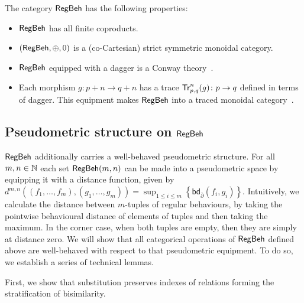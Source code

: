 \begin{theorem}
	The category $\mathsf{RegBeh}$ has the following properties:
	\begin{itemize}
		\item $\mathsf{RegBeh}$ has all finite coproducts. 
		\item $(\mathsf{RegBeh}, \oplus, 0)$ is a (co-Cartesian) strict symmetric monoidal category.
		\item $\mathsf{RegBeh}$ equipped with a dagger is a Conway theory~\cite{Esik:1999:Group}.
		\item Each morphism $g \colon p + n \to q + n$ has a trace $\mathsf{Tr}^{n}_{p,q}(g) \colon p \to q$ defined in terms of dagger. This equipment makes $\mathsf{RegBeh}$ into a traced monoidal category~\cite{Joyal:1996:Traced}. 
	\end{itemize}
\end{theorem} 
\subsection{Pseudometric structure on $\mathsf{RegBeh}$}
$\mathsf{RegBeh}$ additionally carries a well-behaved pseudometric structure. For all $m,n \in \mathbb{N}$ each set $\mathsf{RegBeh}(m,n)$ can be made into a pseudometric space by equipping it with a distance function, given by $d^{m,n}((f_1, \dots, f_m), (g_1, \dots, g_m)) = \sup_{1 \leq i \leq m} \left\{ \mathsf{bd}_{\overline{\partial}}(f_i, g_i) \right\}$.
Intuitively, we calculate the distance between $m$-tuples of regular behaviours, by taking the pointwise behavioural distance of elements of tuples and then taking the maximum. In the corner case, when both tuples are empty, then they are simply at distance zero. We will show that all categorical operations of $\mathsf{RegBeh}$ defined above are well-behaved with respect to that pseudometric equipment. To do so, we establish a series of technical lemmas.

First, we show that substitution preserves indexes of relations forming the stratification of bisimilarity.

